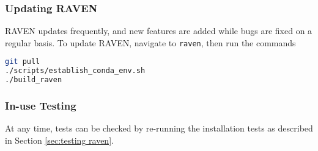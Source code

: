 \subsubsection{Updating RAVEN}
RAVEN updates frequently, and new features are added while bugs are fixed on a regular basis.  To update
RAVEN, navigate to \texttt{raven}, then run the commands
\begin{lstlisting}[language=bash]
git pull
./scripts/establish_conda_env.sh
./build_raven
\end{lstlisting}


\subsubsection{In-use Testing}

At any time, tests can be checked by re-running the installation tests as
described in Section \ref{sec:testing raven}.
